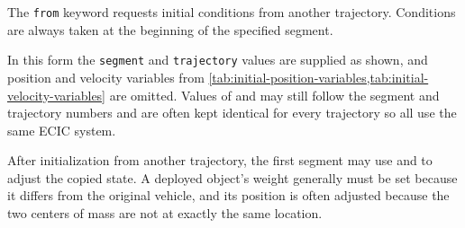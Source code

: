 The \texttt{from} keyword requests initial conditions from another trajectory.
Conditions are always taken at the beginning of the specified segment.

In this form the \texttt{segment} and \texttt{trajectory} values are supplied as
shown, and position and velocity variables from
\cref{tab:initial-position-variables,tab:initial-velocity-variables} are omitted.
Values of  and  may still follow the segment and
trajectory numbers and are often kept identical for every trajectory so all use the
same ECIC system.

After initialization from another trajectory, the first segment may use
 and  to adjust the copied state.
A deployed object's weight generally must be set because it differs from the original
vehicle, and its position is often adjusted because the two centers of mass are not at
exactly the same location.
